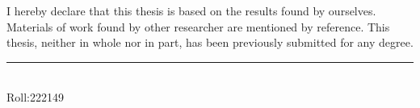 I hereby declare that this thesis is based on the results found by ourselves. Materials
of work found by other researcher are mentioned by reference. This thesis, neither in
whole nor in part, has been previously submitted for any degree.

\vspace{1in}


\noindent   \rule{3.5cm}{1pt} \\
   Roll:222149 \\

